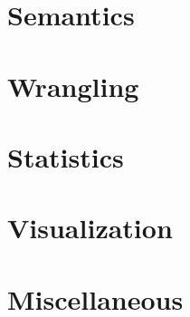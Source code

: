\begin{appendices}
\section{Semantics}


\section{Wrangling}


\section{Statistics}


\section{Visualization}


% 

% 

\section{Miscellaneous}


\end{appendices}
